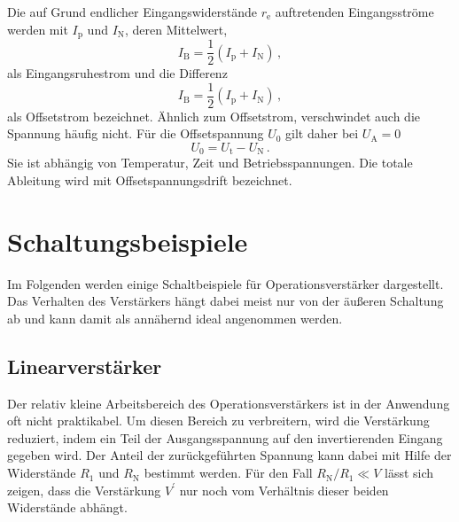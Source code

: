 Die auf Grund endlicher Eingangswiderstände $r_\text{e}$ auftretenden
Eingangsströme werden mit $I_\text{p}$ und $I_\text{N}$, deren
Mittelwert,
\begin{equation}
\label{eq:eingangsruhestrom}
    I_\text{B} = \frac{1}{2}\left(I_\text{p} + I_\text{N}\right)\,,
\end{equation}
als Eingangsruhestrom und die Differenz
\begin{equation}
\label{eq:offsetstrom}
    I_\text{B} = \frac{1}{2}\left(I_\text{p} + I_\text{N}\right)\,,
\end{equation}
als Offsetstrom bezeichnet.
Ähnlich zum Offsetstrom, verschwindet auch die Spannung häufig nicht.
Für die Offsetspannung $U_0$ gilt daher bei $U_\text{A} = 0$
\begin{equation}
\label{eq:offsetspannung}
    U_0 = U_\text{t} - U_\text{N}\,.
\end{equation}
Sie ist abhängig von Temperatur, Zeit und Betriebsspannungen. Die totale
Ableitung wird mit Offsetspannungsdrift bezeichnet.


\section{Schaltungsbeispiele}
\label{sec:schaltungsbeispiele}
Im Folgenden werden einige Schaltbeispiele für Operationsverstärker
dargestellt. Das Verhalten des Verstärkers hängt dabei meist nur von der
äußeren Schaltung ab und kann damit als annähernd ideal angenommen werden.

\subsection{Linearverstärker}
\label{subsec:linearverstärker}
Der relativ kleine Arbeitsbereich des Operationsverstärkers ist in der
Anwendung oft nicht praktikabel. Um diesen Bereich zu verbreitern, wird die
Verstärkung reduziert, indem ein Teil der Ausgangsspannung auf den
invertierenden Eingang gegeben wird.
Der Anteil der zurückgeführten Spannung kann dabei mit Hilfe der Widerstände
$R_1$ und $R_\text{N}$ bestimmt werden. Für den Fall $R_\text{N}/R_1 \ll V$
lässt sich zeigen, dass die Verstärkung $V^\prime$ nur noch vom Verhältnis
dieser beiden Widerstände abhängt.

